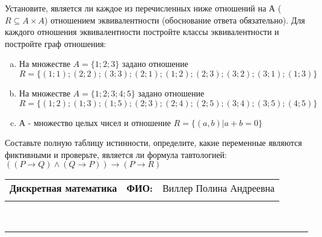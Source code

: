 \documentclass[10pt]{exam}
\newcommand{\class}{Дискретная математика}
\newcommand{\examdate}{}
\begin{document}
\begin{questions}
\question
Установите, является ли каждое из перечисленных ниже отношений на А ($R \subseteq A \times A$) отношением эквивалентности (обоснование ответа обязательно). Для каждого отношения эквивалентности постройте классы 
эквивалентности и постройте граф отношения:
\begin{enumerate} [a)]\setcounter{enumi}{0}
\item На множестве $A = \{1; 2; 3\}$ задано отношение $R = \{(1; 1); (2; 2); (3; 3); (2; 1); (1; 2); (2; 3); (3; 2); (3; 1); (1; 3)\}$
\item На множестве $A = \{1; 2; 3; 4; 5\}$ задано отношение $R = \{(1; 2); (1; 3); (1; 5); (2; 3); (2; 4); (2; 5); (3; 4); (3; 5); (4; 5)\}$
\item А - множество целых чисел и отношение $R = \{(a,b)|a + b = 0\}$
\end{enumerate}\question Составьте полную таблицу истинности, определите, какие переменные являются фиктивными и проверьте, является ли формула тавтологией:
$(( P \rightarrow Q) \land (Q \rightarrow P)) \rightarrow (P \rightarrow R)$

\end{questions}
\newpage
\begin{flushright}
\begin{tabular}{p{2.8in} r l}
\textbf{\class} & \textbf{ФИО:} &Виллер Полина Андреевна
\\

\textbf{\examdate} &&\\
\end{tabular}\\
\end{flushright}
\rule[1ex]{\textwidth}{.1pt}
\end{document}
